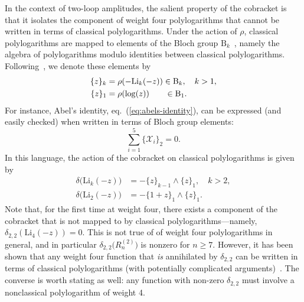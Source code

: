 \documentclass[12pt]{article}
\def\x{\mathcal{X}}
\begin{document}
In the context of two-loop amplitudes, the salient property of the cobracket is that it isolates the component of weight four polylogarithms that cannot be written in terms of classical polylogarithms. Under the action of $\rho$, classical polylogarithms are mapped to elements of the Bloch group $\text{B}_k$~\cite{Bloch:2000, Suslin:1990}, namely the algebra of polylogarithms modulo identities between classical polylogarithms. Following~\cite{Golden:2013xva}, we denote these elements by
\begin{align}
 \{ z \}_k  &= \rho(-\text{Li}_k(-z)) \in \text{B}_k, \quad k>1, \\
 \{ z \}_1  &= \rho(\log(z)) \hspace{.675cm} \in \text{B}_1.
\end{align}
For instance, Abel's identity, eq.~(\ref{eq:abels-identity}), can be expressed (and easily checked) when written in terms of Bloch group elements:
\begin{equation}
	\sum_{i=1}^5 \{\x_i\}_2 = 0.
\end{equation}
In this language, the action of the cobracket on classical polylogarithms is given by
\begin{align}
\delta \big( \text{Li}_k(-z) \big) &= - \{ z \}_{k-1} \wedge \{ z \}_1 , \quad k>2 , \\
\delta \big( \text{Li}_2(-z) \big) &= - \{ 1 + z \}_{1} \wedge \{ z \}_1.
\end{align}
Note that, for the first time at weight four, there exists a component of the cobracket that is not mapped to by classical polylogarithms---namely, $\delta_{2,2}(\text{Li}_4(-z))=0$. This is not true of of weight four polylogarithms in general, and in particular $\delta_{2,2} \big(R_n^{(2)} \big)$ is nonzero for $n\ge7$. However, it has been shown that any weight four function that \emph{is} annihilated by $\delta_{2,2}$ can be written in terms of classical polylogarithms (with potentially complicated arguments)~\cite{G91a,2018arXiv180308585G}. The converse is worth stating as well: any function with non-zero $\delta_{2,2}$ must involve a nonclassical polylogarithm of weight 4. 
\end{document}
